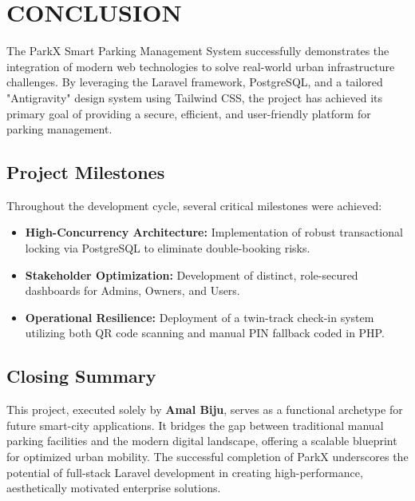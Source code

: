 \chapter{CONCLUSION}
The ParkX Smart Parking Management System successfully demonstrates the integration of modern web technologies to solve real-world urban infrastructure challenges. By leveraging the Laravel framework, PostgreSQL, and a tailored "Antigravity" design system using Tailwind CSS, the project has achieved its primary goal of providing a secure, efficient, and user-friendly platform for parking management.

\section{Project Milestones}
Throughout the development cycle, several critical milestones were achieved:
\begin{itemize}
    \item \textbf{High-Concurrency Architecture:} Implementation of robust transactional locking via PostgreSQL to eliminate double-booking risks.
    \item \textbf{Stakeholder Optimization:} Development of distinct, role-secured dashboards for Admins, Owners, and Users.
    \item \textbf{Operational Resilience:} Deployment of a twin-track check-in system utilizing both QR code scanning and manual PIN fallback coded in PHP.
\end{itemize}

\section{Closing Summary}
This project, executed solely by \textbf{Amal Biju}, serves as a functional archetype for future smart-city applications. It bridges the gap between traditional manual parking facilities and the modern digital landscape, offering a scalable blueprint for optimized urban mobility. The successful completion of ParkX underscores the potential of full-stack Laravel development in creating high-performance, aesthetically motivated enterprise solutions.
